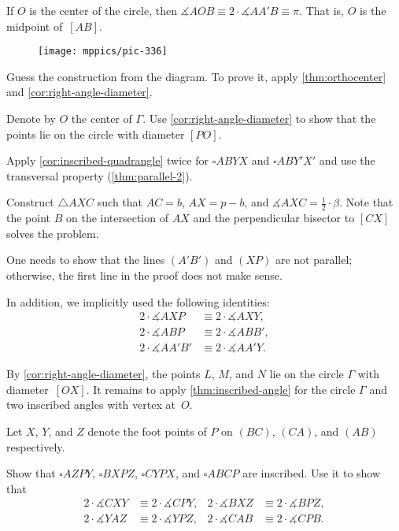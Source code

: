 \begin{multicols}{2}
If $O$ is the center of the circle, then 
$\measuredangle AOB\equiv 2\cdot \measuredangle AA'B\equiv\pi$.
That is, $O$ is the midpoint of~$[AB]$.

\begin{wrapfigure}[8]{r}{20mm}
\vskip-5mm
\centering
\texttt{[image: mppics/pic-336]}
\end{wrapfigure}

Guess the construction from the diagram.
To prove it,
apply \ref{thm:orthocenter} and \ref{cor:right-angle-diameter}.

Denote by $O$ the center of $\Gamma$.
Use \ref{cor:right-angle-diameter} to show that the points lie on the circle with diameter $[PO]$.

Apply \ref{cor:inscribed-quadrangle} twice for $\square ABYX$ and $\square ABY'X'$ and use the transversal property (\ref{thm:parallel-2}).

Construct $\triangle AXC$ such that $AC=b$, $AX=p-b$, and $\measuredangle AXC=\tfrac12\cdot \beta$.
Note that the point $B$ on the intersection of $AX$ and the perpendicular bisector to $[CX]$ solves the problem. 


One needs to show that the lines $(A'B')$ and $(XP)$ are not parallel; otherwise, the first line in the proof does not make sense.



In addition, we implicitly used the following identities:
\begin{align*}
2\cdot \measuredangle AXP&\equiv2\cdot \measuredangle AXY,
\\
2\cdot \measuredangle ABP&\equiv2\cdot \measuredangle ABB',
\\
2\cdot \measuredangle AA'B'&\equiv2\cdot \measuredangle AA'Y.
\end{align*}

By \ref{cor:right-angle-diameter},
the points $L$, $M$, and $N$ lie on the circle $\Gamma$ with diameter~$[OX]$.
It remains to apply \ref{thm:inscribed-angle} for the circle $\Gamma$ 
and two inscribed angles with vertex at~$O$.

Let $X$, $Y$, and $Z$ denote the foot points of $P$ on $(BC)$, $(CA)$, and $(AB)$ respectively.

Show that $\square AZPY$, $\square BXPZ$, $\square CYPX$, and $\square ABCP$ are inscribed.
Use it to show that
\begin{align*}
2\cdot \measuredangle CXY&\equiv 2\cdot \measuredangle CPY,
&
2\cdot \measuredangle BXZ&\equiv 2\cdot \measuredangle BPZ,
\\
2\cdot \measuredangle YAZ&\equiv 2\cdot \measuredangle YPZ,
&
2\cdot \measuredangle CAB&\equiv 2\cdot \measuredangle CPB.
\end{align*}


\end{multicols}

